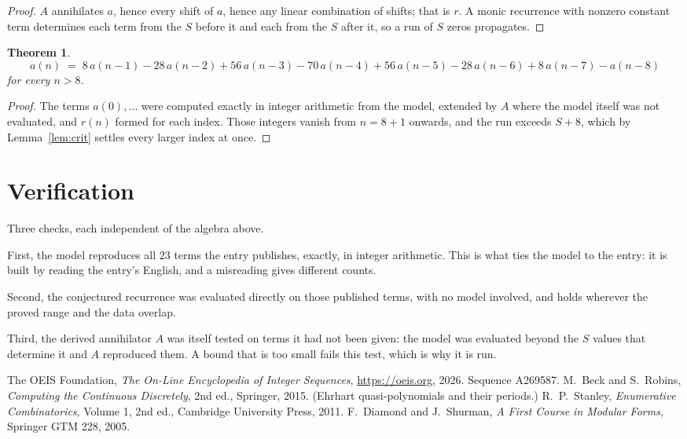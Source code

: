 \documentclass[11pt,a4paper]{article}
\theoremstyle{plain}
\newtheorem{theorem}{Theorem}
\theoremstyle{definition}
\begin{document}
\begin{proof}
$A$ annihilates $a$, hence every shift of $a$, hence any linear combination of shifts; that is
$r$. A monic recurrence with nonzero constant term determines each term from the $S$ before it
and each from the $S$ after it, so a run of $S$ zeros propagates.
\end{proof}

\begin{theorem}
\[
a(n)\;=\;8\,a(n-1) - 28\,a(n-2) + 56\,a(n-3) - 70\,a(n-4) + 56\,a(n-5) - 28\,a(n-6) + 8\,a(n-7) - a(n-8)
\]
for every $n>8$.
\end{theorem}

\begin{proof}
The terms $a(0),\dots$ were computed exactly in integer arithmetic from the model, extended by
$A$ where the model itself was not evaluated, and $r(n)$ formed for each index. Those integers
vanish from $n=8+1$ onwards, and the run exceeds $S+8$, which by
Lemma~\ref{lem:crit} settles every larger index at once.
\end{proof}

\section{Verification}

Three checks, each independent of the algebra above.

First, the model reproduces all $23$ terms the entry publishes, exactly, in integer
arithmetic. This is what ties the model to the entry: it is built by reading the entry's
English, and a misreading gives different counts.

Second, the conjectured recurrence was evaluated directly on those published terms, with no
model involved, and holds wherever the proved range and the data overlap.

Third, the derived annihilator $A$ was itself tested on terms it had not been given: the model
was evaluated beyond the $S$ values that determine it and $A$ reproduced them. A bound that is
too small fails this test, which is why it is run.

\begin{thebibliography}{9}
 The OEIS Foundation, \emph{The On-Line Encyclopedia of Integer
Sequences}, \url{https://oeis.org}, 2026. Sequence A269587.
 M.~Beck and S.~Robins, \emph{Computing the Continuous Discretely},
2nd ed., Springer, 2015. (Ehrhart quasi-polynomials and their periods.)
 R.~P.~Stanley, \emph{Enumerative Combinatorics}, Volume 1, 2nd ed.,
Cambridge University Press, 2011.
 F.~Diamond and J.~Shurman, \emph{A First Course in Modular Forms},
Springer GTM 228, 2005.
\end{thebibliography}
\end{document}
